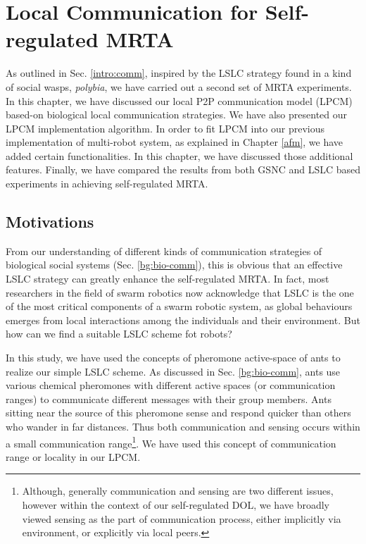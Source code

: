 \chapter{Local Communication for Self-regulated MRTA}
\label{local-comm}
As outlined in Sec. \ref{intro:comm}, inspired by the LSLC strategy found in a kind of social wasps, {\em polybia}, we have carried out a second set of MRTA experiments. In this chapter, we have discussed our local P2P communication  model (LPCM) based-on biological local communication strategies. We have also presented our LPCM implementation algorithm.  In order to fit LPCM into our previous implementation of multi-robot system, as explained in Chapter \ref{afm}, we have added  certain functionalities. In this chapter, we have discussed those additional features. Finally, we have compared the results from both GSNC and LSLC based experiments in achieving self-regulated MRTA. 
\section{Motivations}
From our understanding of different kinds of communication strategies of biological social systems (Sec. \ref{bg:bio-comm}), this is obvious that an effective LSLC strategy can greatly enhance the self-regulated MRTA.  In fact, most  researchers in the field of swarm robotics now acknowledge that LSLC is the one of the most critical components of a swarm robotic system, as global behaviours emerges from local interactions among the individuals and their environment. But how can we find a suitable LSLC scheme fot robots?

In this study, we have used the concepts of pheromone active-space of ants to realize our simple LSLC scheme. As discussed in Sec. \ref{bg:bio-comm}, ants use various chemical pheromones with different active spaces (or communication ranges) to communicate different messages with their group members. Ants sitting near the source of this pheromone sense and respond quicker than others who wander in far distances. Thus both communication and sensing occurs within a small communication range\footnote{Although, generally communication and sensing are two different issues, however within the context of our self-regulated DOL, we have broadly viewed sensing as the part of communication process, either implicitly via environment, or explicitly via local peers.}. We have used this concept of communication range or locality in our LPCM.

